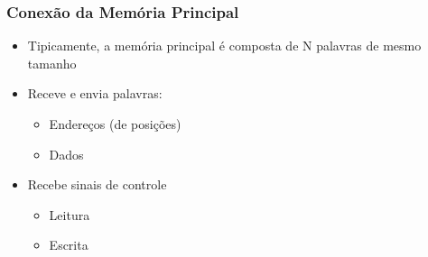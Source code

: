 \documentclass[12pt]{article}
\begin{document}
        \subsubsection{Conexão da Memória Principal}
        \begin{itemize}
            \item Tipicamente, a memória principal é composta de N palavras de 
            mesmo tamanho
            \item Receve e envia palavras:
            \begin{itemize}
                \item Endereços (de posições)
                \item Dados
            \end{itemize}
            \item Recebe sinais de controle
            \begin{itemize}
                \item Leitura
                \item Escrita
            \end{itemize}
        \end{itemize}
\end{document}
